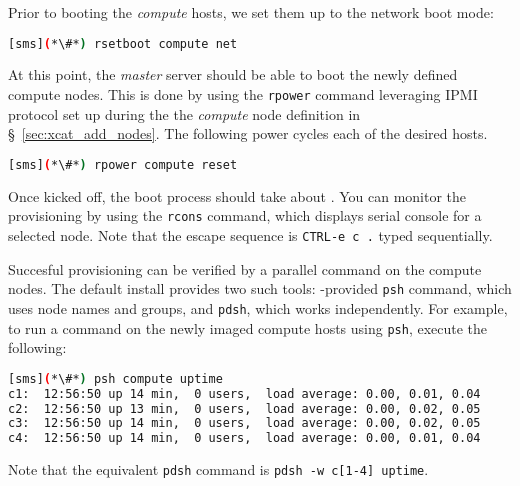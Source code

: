 Prior to booting the {\em compute} hosts, we set them up to the network boot
mode:

\begin{lstlisting}[language=bash,keywords={},upquote=true]
[sms](*\#*) rsetboot compute net
\end{lstlisting} 

At this point, the {\em master} server should be able to boot the newly defined
compute nodes. This is done by using the \texttt{rpower} \xCAT{} command
leveraging IPMI protocol set up during the the {\em compute} node definition
in \S~\ref{sec:xcat_add_nodes}. The following power cycles each of the
desired hosts.


\begin{lstlisting}[language=bash,keywords={},upquote=true]
[sms](*\#*) rpower compute reset
\end{lstlisting} 

Once kicked off, the boot process should take about .  You can monitor the
provisioning by using the \texttt{rcons} command, which displays serial console
for a selected node. Note that the escape sequence
is \texttt{CTRL-e c .} typed sequentially. 

Succesful provisioning can be verified by a parallel command on the compute
nodes. The default install provides two such tools: \xCAT{}-provided
\texttt{psh} command, which uses \xCAT{} node names and groups,
and \texttt{pdsh}, which works independently.  For example, to run a command on
the newly imaged compute hosts using \texttt{psh}, execute the following:

\begin{lstlisting}[language=bash]
[sms](*\#*) psh compute uptime
c1:  12:56:50 up 14 min,  0 users,  load average: 0.00, 0.01, 0.04
c2:  12:56:50 up 13 min,  0 users,  load average: 0.00, 0.02, 0.05
c3:  12:56:50 up 14 min,  0 users,  load average: 0.00, 0.02, 0.05
c4:  12:56:50 up 14 min,  0 users,  load average: 0.00, 0.01, 0.04
\end{lstlisting}
Note that the equivalent \texttt{pdsh} command is \texttt{pdsh -w c[1-4] uptime}. 
